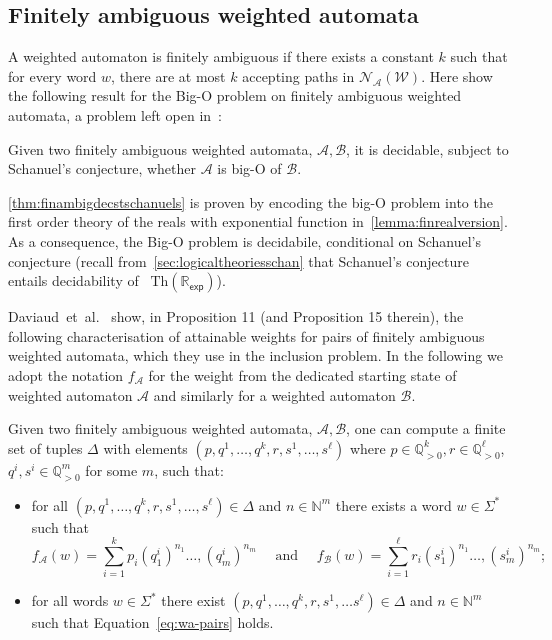 \documentclass[10pt,a4paper]{amsart}
\numberwithin{equation}{section}
\theoremstyle{plain}
\theoremstyle{definition}
\theoremstyle{remark}
\newcommand\nfa{\mathcal{N}}
\newcommand\wa{\mathcal{W}}
\newcommand\nfaof[2]{\nfa_{#2}(#1)}
\newcommand{\rexp}{$\mathrm{Th}(\mathbb R_{\mathsf{exp}})$}
\begin{document}
\subsection{Finitely ambiguous weighted automata}
A weighted automaton is finitely ambiguous if there exists a constant $k$ such that for every word $w$, there are at most $k$ accepting paths in  $\nfaof{\wa}{\mathcal{A}}$. Here show the following result for the Big-O problem on finitely ambiguous weighted automata, a problem left open in~\cite{ChistikovKMP20}:


\begin{thm}\label{thm:finambigdecstschanuels}
  Given two finitely ambiguous weighted automata, $\mathcal{A},\mathcal{B}$, it is decidable, subject to Schanuel's conjecture, whether $\mathcal{A}$ is big-O of $\mathcal{B}$.
\end{thm}


\cref{thm:finambigdecstschanuels} is proven by encoding the big-O problem into  the first order theory of the reals with exponential function in~\cref{lemma:finrealversion}. As a consequence, the Big-O problem is decidabile, conditional on Schanuel's conjecture (recall from~\cref{sec:logicaltheoriesschan} that Schanuel's conjecture entails decidability of ~\rexp).

Daviaud~et~al.~\cite{DAVIAUD202178} show, in Proposition 11 (and Proposition 15 therein), the following characterisation of attainable weights for pairs of finitely ambiguous weighted automata, which they use in the inclusion problem. In the following we adopt the notation $f_{\mathcal{A}}$ for the weight from the dedicated starting state of weighted automaton $\mathcal{A}$ and similarly for a weighted automaton $\mathcal{B}$.

\begin{thm}
Given two finitely ambiguous weighted automata, $\mathcal{A},\mathcal{B}$, one can compute a finite set of tuples $\Delta$ with elements $({p},{q}^1,\dots, {q}^{k}, {r},{s}^1,\dots, {s}^{\ell})$ where $p\in\mathbb{Q}_{>0}^{k},r\in\mathbb{Q}_{>0}^{\ell}$, $q^{i},s^{i} \in \mathbb{Q}_{>0}^{m}$ for some $m$, such that:
\begin{itemize}
\item for all $({p},{q}^1,\dots, {q}^{k}, {r},{s}^1,\dots, {s}^{\ell}) \in \Delta$ and ${n} \in \mathbb{N}^m$ there exists a word $w\in \Sigma^*$ such that
\begin{equation}
\label{eq:wa-pairs}
f_\mathcal{A}(w) = \sum_{i=1}^{k} p_i{({q}^i_1)}^{n_1}\dots, {({q}^i_m)}^{n_m}
\quad \text{ and } \quad f_\mathcal{B}(w) = \sum_{i=1}^{\ell} r_i{({s}^i_1)}^{n_1}\dots, {({s}^i_m)}^{n_m};
\end{equation}
\item for all words  $w\in \Sigma^*$ there exist  $({p},{q}^1,\dots, {q}^{k}, {r},{s}^1,\dots {s}^{\ell}) \in \Delta$ and ${n} \in \mathbb{N}^m$  such that Equation~\eqref{eq:wa-pairs} holds.
\end{itemize}

\end{thm}
\end{document}
